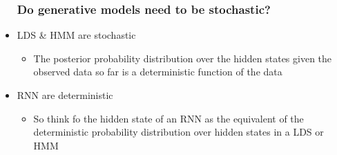 \begin{itemize}
	\subsubsection{Do generative models need to be stochastic?}
	\item LDS \& HMM are stochastic
	\begin{itemize}
		\item The posterior probability distribution over the hidden states given the observed data so far is a deterministic function of the data
	\end{itemize}
	\item RNN are deterministic
	\begin{itemize}
		\item So think fo the hidden state of an RNN as the equivalent of the deterministic probability distribution over hidden states in a LDS or HMM
	\end{itemize}

\end{itemize}

